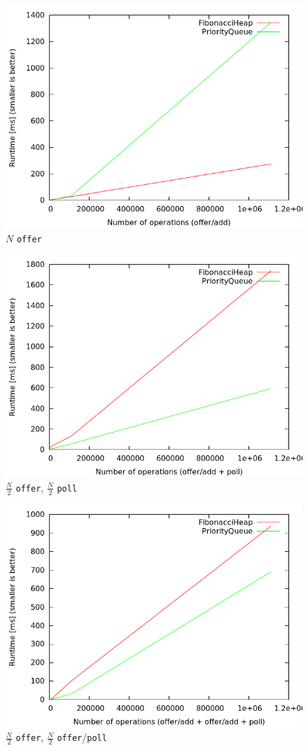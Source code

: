 \documentclass{article}
\begin{document}
\begin{figure}
    \includegraphics[width=.9\textwidth]{n_offer.png}
    \caption{$N$ \texttt{offer}}
\end{figure}

\begin{figure}
    \includegraphics[width=.9\textwidth]{n2_offer_n2_poll.png}
    \caption{$\frac{N}{2}$ \texttt{offer}, $\frac{N}{2}$ \texttt{poll}}
\end{figure}

\begin{figure}
    \includegraphics[width=.9\textwidth]{n2_offer_n2_offer_poll.png}
    \caption{$\frac{N}{2}$ \texttt{offer}, $\frac{N}{2}$ \texttt{offer}/\texttt{poll}}
\end{figure}
\end{document}
